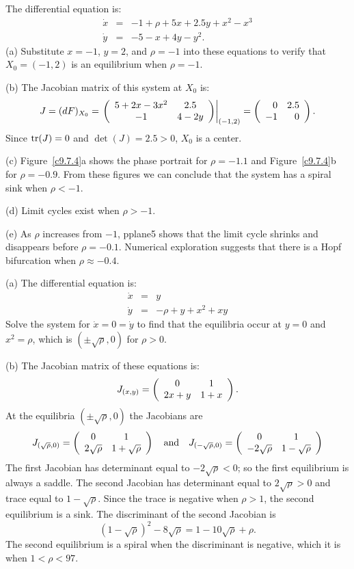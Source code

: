 \documentclass{ximera}
\begin{document}
\soln  The differential equation  is:
\[
\begin{array}{rcl}
\dot{x} & = & -1 + \rho + 5x + 2.5y + x^2 - x^3 \\
\dot{y} & = & -5 - x + 4y - y^2.  \end{array}
\]
(a) Substitute $x=-1$, $y=2$, and $\rho=-1$ into these equations to 
verify that $X_0=(-1,2)$ is an equilibrium when $\rho=-1$.

(b) The Jacobian matrix of this system at $X_0$ is:
\[
J = (dF)_{X_0} = \left.\left(\begin{array}{cc} 5 + 2x-3x^2 & 2.5\\ -1 &4-2y\end{array}\right)\right|_{(-1,2)}
= \left(\begin{array}{rr} 0 & 2.5\\ -1 &0\end{array}\right).
\]
Since ${\rm tr}(J)=0$ and $\det(J)=2.5>0$, $X_0$ is a center.

(c) Figure~\ref{c9.7.4}a shows the phase portrait for $\rho=-1.1$ and 
Figure~\ref{c9.7.4}b for $\rho=-0.9$.  From these figures we can conclude 
that the system has a spiral sink when $\rho<-1$.

(d) Limit cycles exist when $\rho>-1$.

(e)  As $\rho$ increases from $-1$, {\sf pplane5} shows that the limit 
cycle shrinks and disappears before $\rho=-0.1$. Numerical exploration
suggests that there is a Hopf bifurcation when $\rho\approx -0.4$.

\begin{figure}[htb]
                       \centerline{%
                       }
\end{figure}


 \soln
(a) The differential equation  is:
\[
\begin{array}{rcl}
\dot{x} & = &  y \\
\dot{y} & = &  -\rho + y + x^2 + xy
\end{array}
\]
Solve the system for $\dot{x} = 0 = \dot{y}$ to find that the equilibria
occur at $y = 0$ and $x^2 = \rho$, which is $(\pm\sqrt{\rho},0)$
for $\rho > 0$.

(b)  The Jacobian matrix of these equations is:
\[
J_{(x,y)} = \left(\begin{array}{cc} 0 & 1\\ 2x+y &1+x\end{array}\right).
\]
At the equilibria $(\pm\sqrt{\rho},0)$ the Jacobians are
\[
J_{(\sqrt{\rho},0)}= \left(\begin{array}{cc} 0 & 1\\ 2\sqrt{\rho} &1+\sqrt{\rho}\end{array}\right) 
\quad\mbox{and}\quad
J_{(-\sqrt{\rho},0)}= \left(\begin{array}{cc} 0 & 1\\ -2\sqrt{\rho} &1-\sqrt{\rho}\end{array}\right)
\]
The first Jacobian has determinant equal to $-2\sqrt{\rho}<0$; so the
first equilibrium is always a saddle.  The second Jacobian has determinant
equal to $2\sqrt{\rho}>0$ and trace equal to $1-\sqrt{\rho}$.  Since the
trace is negative when $\rho>1$, the second equilibrium is a sink.  The
discriminant of the second Jacobian is 
\[
(1-\sqrt{\rho})^2-8\sqrt{\rho}=1-10\sqrt{\rho}+\rho.
\]
The second equilibrium is a spiral when the discriminant is negative, which
it is when $1<\rho<97$.
\end{document}
